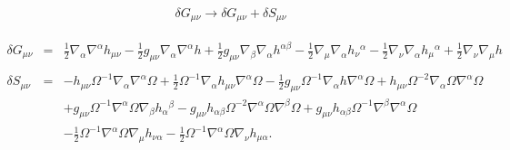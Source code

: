 \documentclass[10pt,letterpaper]{article}
\numberwithin{equation}{section}
\begin{document}
\begin{appendices}
\begin{eqnarray}
\delta G_{\mu\nu} \to \delta G_{\mu\nu} + \delta S_{\mu\nu}
\end{eqnarray}

\begin{eqnarray}
\delta G_{\mu\nu}&=&\tfrac{1}{2} \nabla_{\alpha}\nabla^{\alpha}h_{\mu \nu}
-  \tfrac{1}{2} g_{\mu \nu} \nabla_{\alpha}\nabla^{\alpha}h
+ \tfrac{1}{2} g_{\mu \nu} \nabla_{\beta}\nabla_{\alpha}h^{\alpha \beta}
-  \tfrac{1}{2} \nabla_{\mu}\nabla_{\alpha}h_{\nu}{}^{\alpha}
-  \tfrac{1}{2} \nabla_{\nu}\nabla_{\alpha}h_{\mu}{}^{\alpha}
+ \tfrac{1}{2} \nabla_{\nu}\nabla_{\mu}h
\nonumber\\ \nonumber\\
\delta S_{\mu\nu} &=&- h_{\mu \nu} \Omega^{-1} \nabla_{\alpha}\nabla^{\alpha}\Omega
 + \tfrac{1}{2} \Omega^{-1} \nabla_{\alpha}h_{\mu \nu} \nabla^{\alpha}\Omega
 -  \tfrac{1}{2} g_{\mu \nu} \Omega^{-1} \nabla_{\alpha}h \nabla^{\alpha}\Omega
 + h_{\mu \nu} \Omega^{-2} \nabla_{\alpha}\Omega \nabla^{\alpha}\Omega\nonumber\\
&& + g_{\mu \nu} \Omega^{-1} \nabla^{\alpha}\Omega \nabla_{\beta}h_{\alpha}{}^{\beta}
 -  g_{\mu \nu} h_{\alpha \beta} \Omega^{-2} \nabla^{\alpha}\Omega \nabla^{\beta}\Omega
 + g_{\mu \nu} h_{\alpha \beta} \Omega^{-1} \nabla^{\beta}\nabla^{\alpha}\Omega\nonumber\\
&& -  \tfrac{1}{2} \Omega^{-1} \nabla^{\alpha}\Omega \nabla_{\mu}h_{\nu \alpha}
 -  \tfrac{1}{2} \Omega^{-1} \nabla^{\alpha}\Omega \nabla_{\nu}h_{\mu \alpha}.
\end{eqnarray}


\end{appendices}
\end{document}
